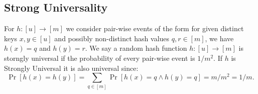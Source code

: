 \subsection{Strong Universality}
For $h : [u] \rightarrow [m]$ we consider pair-wise events of the form for given
distinct keys $x,y \in [u]$ and possibly non-distinct hash values $q,r \in [m]$,
we have $h(x) = q$ and $h(y) = r$. We say a random hash function $h : [u]
\rightarrow [m]$ is storngly universal if the probability of every pair-wise
event is $1/m^2$. If $h$ is Strongly Universal it is also universal since:
\[
  \Pr[h(x) = h(y)] = \sum_{q\in [m]} \Pr[h(x) = q \land h(y) = q] = m/m^2  = 1/m.
\]

